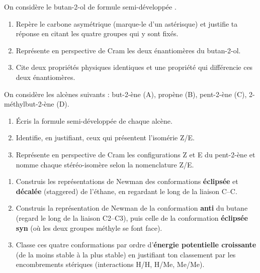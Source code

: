 \documentclass[11pt]{article}
\newcommand{\cle}[1]{{\popxbold\color{popdark}#1}}
\begin{document}
\begin{exercice}
On considère le butan-2-ol de formule semi-développée .
\begin{enumerate}
\item Repère le carbone asymétrique (marque-le d'un astérisque) et justifie ta réponse en citant les quatre groupes qui y sont fixés.
\item Représente en perspective de Cram les deux énantiomères du butan-2-ol.
\item Cite deux propriétés physiques identiques et une propriété qui différencie ces deux énantiomères.
\end{enumerate}
\end{exercice}

\begin{exercice}[Isomérie Z/E]
On considère les alcènes suivants : but-2-ène (A), propène (B), pent-2-ène (C), 2-méthylbut-2-ène (D).
\begin{enumerate}
\item Écris la formule semi-développée de chaque alcène.
\item Identifie, en justifiant, ceux qui présentent l'isomérie Z/E.
\item Représente en perspective de Cram les configurations Z et E du pent-2-ène et nomme chaque stéréo-isomère selon la nomenclature \cle{Z/E}.
\end{enumerate}
\end{exercice}

\begin{exercice}
\begin{enumerate}
\item Construis les représentations de Newman des conformations \textbf{éclipsée} et \textbf{décalée} (staggered) de l'éthane, en regardant le long de la liaison C--C.
\item Construis la représentation de Newman de la conformation \textbf{anti} du butane (regard le long de la liaison C2--C3), puis celle de la conformation \textbf{éclipsée syn} (où les deux groupes méthyle se font face).
\item Classe ces quatre conformations par ordre d'\textbf{énergie potentielle croissante} (de la moins stable à la plus stable) en justifiant ton classement par les encombrements stériques (interactions H/H, H/Me, Me/Me).
\end{enumerate}
\end{exercice}
\end{document}
